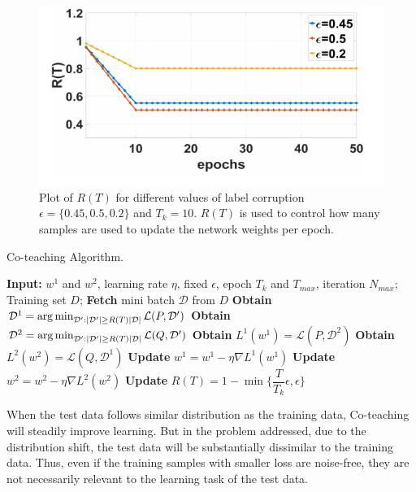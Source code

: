 \begin{figure}[ht]
            \centering
            \includegraphics[scale = 0.5]{plot_R(T).png}
            \caption{Plot of $R(T)$ for different values of label corruption $\epsilon =\{0.45,0.5,0.2\}$ and $T_k = 10$. $R(T)$ is used \cite{coteaching} to control how many samples are used to update the network weights per epoch.}
\label{fig:R(T)}
\end{figure}
\begin{algorithm}[H]
	\caption{Co-teaching Algorithm.} 
	\begin{algorithmic}[1]
	    \State \textbf{Input:} $w^1$ and $w^2$, learning rate $\eta$, fixed $\epsilon$, epoch $T_k$ and $T_{max}$, iteration $N_{max}$;
		    \State Training set ${D}$;
				    \State \textbf{Fetch} mini batch $\mathcal{D}$ from ${D}$
				    \State \textbf{Obtain} $\mathcal{D}^1 = \operatorname*{arg\,min}_{\mathcal{D}':|\mathcal{D}'|\geq R(T)|\mathcal{D}|} \mathcal{L}(P, \mathcal{D}')$   
				    \State \textbf{Obtain} $\mathcal{D}^2 = \operatorname*{arg\,min}_{\mathcal{D}':|\mathcal{D}'|\geq R(T)|\mathcal{D}|} \mathcal{L}(Q, \mathcal{D}')$
				    \State \textbf{Obtain} $L^1(w^1) = \mathcal{L}(P,\mathcal{D}^2)$ 
				    \State \textbf{Obtain} $L^2(w^2) = \mathcal{L}(Q,\mathcal{D}^1)$ 
				    \State \textbf{Update} $w^1 = w^1 - \eta \nabla L^1(w^1)$
				    \State \textbf{Update} $w^2 = w^2 - \eta \nabla L^2(w^2)$
			    \EndFor
			 \State \textbf{Update} $R(T)= 1- \min\bigg\{\dfrac{T}{T_k}\epsilon, \epsilon\bigg\}$
		\EndFor
	\end{algorithmic} 
\label{algo:coteaching}
\end{algorithm}


When the test data follows similar distribution as the training data, Co-teaching will steadily improve learning. 
But in the problem addressed, due to the distribution shift, the test data will be substantially dissimilar to the training data. 
Thus, even if the training samples with smaller loss are noise-free, they are not necessarily relevant to the learning task of the test data.